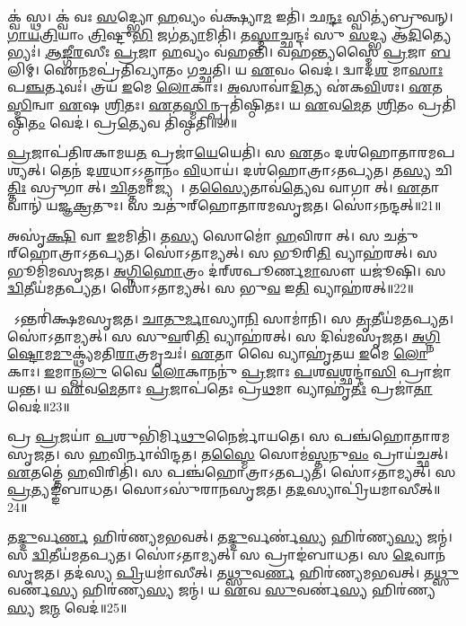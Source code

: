 𑌕𑍍𑌵॑ 𑌸𑍍𑌥।
𑌕𑍍𑌵॑ 𑌵𑌃 \ul{𑌸}𑌦𑍍𑌭𑍍𑌯𑍋 \ul{𑌹}𑌵𑍍𑌯𑌂 𑌵॑𑌕𑍍𑌷𑍍𑌯𑌾\ul{𑌮} 𑌇𑌤𑌿॑।
𑌛\ul{𑌨𑍍𑌦𑌃} 𑌸𑍍𑌵𑌿𑌤𑍍𑌯॑𑌬𑍍𑌰𑍁𑌵𑌨𑍍।
\ul{𑌗𑌾}\ul{𑌯}\ul{𑌤𑍍𑌰𑌿}𑌯𑌾𑌂 \ul{𑌤𑍍𑌰𑌿}𑌷𑍍𑌟𑍁\ul{𑌭𑌿} 𑌜𑌗॑\ul{𑌤𑍍𑌯𑌾}𑌮𑌿𑌤𑌿॑।
𑌤\ul{𑌸𑍍𑌮𑌾}𑌚𑍍𑌛𑌨𑍍𑌦𑌃॑ 𑌸𑍁 \ul{𑌸}𑌦𑍍𑌭𑍍𑌯 𑌆॑\ul{𑌦𑌿}𑌤𑍍𑌯𑍇𑌭𑍍𑌯𑌃॑।
\ul{𑌆}\ul{𑌙𑍍𑌗𑍀}\ul{𑌰}𑌸𑍀𑌃 \ul{𑌪𑍍𑌰}𑌜𑌾 \ul{𑌹}𑌵𑍍𑌯𑌂 𑌵॑𑌹𑌨𑍍𑌤𑌿।
𑌵𑌹॑𑌨𑍍𑌤𑍍𑌯𑌸𑍍𑌮𑍈 \ul{𑌪𑍍𑌰}𑌜𑌾 \ul{𑌬}𑌲𑌿𑌮𑍍।
𑌐\ul{𑌨}𑌮𑌪𑍍𑌰॑𑌤𑌿𑌖𑍍𑌯𑌾𑌤𑌂 𑌗𑌚𑍍𑌛𑌤𑌿।
𑌯 \ul{𑌏}𑌵𑌂 𑌵𑍇𑌦॑।
𑌦𑍍𑌵𑌾𑌦॑\ul{𑌶} 𑌮𑌾\ul{𑌸𑌾𑌃} 𑌪\ul{𑌞𑍍𑌚}𑌰𑍍𑌤𑌵𑌃॑।
𑌤𑍍𑌰𑌯॑ \ul{𑌇}𑌮𑍇 \ul{𑌲𑍋}𑌕𑌾𑌃।
\ul{𑌅}𑌸𑌾𑌵𑌾॑\ul{𑌦𑌿}𑌤𑍍𑌯 𑌏॑𑌕\ul{𑌵𑌿}\ul{}𑌶𑌃।
\ul{𑌏}𑌤\ul{𑌸𑍍𑌮𑌿}𑌨𑍍𑌵𑌾 \ul{𑌏}𑌷 \ul{𑌶𑍍𑌰𑌿}𑌤𑌃।
\ul{𑌏}𑌤\ul{𑌸𑍍𑌮𑌿}𑌨𑍍𑌪𑍍𑌰𑌤𑌿॑\-𑌷𑍍𑌠𑌿𑌤𑌃।
𑌯 \ul{𑌏}𑌵\ul{𑌮𑍇}𑌤 \ul{𑌶𑍍𑌰𑌿}𑌤𑌂 𑌪𑍍𑌰𑌤𑌿॑\-𑌷𑍍𑌠𑌿\ul{𑌤𑌂} 𑌵𑍇𑌦॑।
𑌪𑍍𑌰\ul{𑌤𑍍𑌯𑍇}𑌵 𑌤𑌿॑𑌷𑍍𑌠𑌤𑌿॥20॥\anuvakamend[\ul{𑌸𑍍𑌯𑌾}𑌦𑌿𑌤𑌿॑ 𑌸𑌂𑌵\ul{𑌥𑍍𑌸}𑌰𑍋 𑌜॑𑌨𑌯\ul{𑌧𑍍𑌵}𑌮𑌿𑌤𑍀𑌤𑍍𑌯॑𑌬𑍍𑌰\ul{𑌵𑍀}𑌤𑍍𑌪𑍂\ul{𑌰𑍍𑌵} 𑌇𑌤𑍍𑌯𑌾॑\ul{𑌦𑌿}𑌤𑍍𑌯𑌾\ul{𑌨𑍃}𑌤\ul{𑌵𑌃} 𑌷𑌟𑍍𑌚॑]

\ul{𑌪𑍍𑌰}𑌜𑌾𑌪॑𑌤𑌿𑌰𑌕𑌾𑌮𑌯\ul{𑌤} 𑌪𑍍𑌰𑌜𑌾॑\ul{𑌯𑍇}𑌯𑍇𑌤𑌿॑।
𑌸 \ul{𑌏}𑌤𑌂 𑌦𑌶॑𑌹𑍋𑌤𑌾𑌰𑌮𑌪𑌶𑍍𑌯𑌤𑍍।
𑌤𑍇𑌨॑ 𑌦\ul{𑌶}𑌧𑌾\-𑌽𑌽𑌤𑍍𑌮𑌾𑌨𑌂॑ \ul{𑌵𑌿}𑌧𑌾𑌯॑।
𑌦𑌶॑𑌹𑍋𑌤𑍍𑌰𑌾\-𑌽𑌤𑌪𑍍𑌯𑌤।
𑌤\ul{𑌸𑍍𑌯} 𑌚𑌿\ul{𑌤𑍍𑌤𑌿𑌃} 𑌸𑍍𑌰𑍁𑌗𑌾𑌸𑍀᳚𑌤𑍍।
\ul{𑌚𑌿}𑌤𑍍𑌤𑌮𑌾𑌜𑍍𑌯𑌮𑍍᳚।
𑌤\ul{𑌸𑍍𑌯𑍈}𑌤𑌾𑌵॑\ul{𑌤𑍍𑌯𑍇}𑌵 𑌵𑌾𑌗𑌾𑌸𑍀᳚𑌤𑍍।
\ul{𑌏}𑌤𑌾𑌵𑌾𑌨𑍍॑ 𑌯𑌜𑍍𑌞\ul{𑌕𑍍𑌰}𑌤𑍁𑌃।
𑌸 𑌚𑌤𑍁॑𑌰𑍍‌\mbox{}𑌹𑍋𑌤𑌾𑌰𑌮𑌸𑍃𑌜𑌤।
𑌸𑍋॑𑌽𑌨𑌨𑍍𑌦𑌤𑍍॥21॥

𑌅𑌸𑍃॑\ul{𑌕𑍍𑌷𑌿} 𑌵𑌾 \ul{𑌇}𑌮𑌮𑌿𑌤𑌿॑।
𑌤\ul{𑌸𑍍𑌯} 𑌸𑍋𑌮𑍋॑ \ul{𑌹}𑌵𑌿𑌰𑌾𑌸𑍀᳚𑌤𑍍।
𑌸 𑌚𑌤𑍁॑𑌰𑍍‌\mbox{}𑌹𑍋𑌤𑍍𑌰𑌾\-𑌽𑌤𑌪𑍍𑌯𑌤।
𑌸𑍋॑𑌽𑌤𑌾𑌮𑍍𑌯𑌤𑍍।
𑌸 𑌭𑍂𑌰𑌿\ul{𑌤𑌿} 𑌵𑍍𑌯𑌾𑌹॑𑌰𑌤𑍍।
𑌸 𑌭𑍂𑌮𑌿॑𑌮𑌸𑍃𑌜𑌤।
\ul{𑌅}\ul{𑌗𑍍𑌨𑌿}\ul{𑌹𑍋}𑌤𑍍𑌰𑌂 𑌦॑𑌰𑍍‌\mbox{}𑌶𑌪𑍂𑌰𑍍𑌣\ul{𑌮𑌾}𑌸𑍗 𑌯𑌜𑍂॑𑌷𑌿।
𑌸 \ul{𑌦𑍍𑌵𑌿}𑌤𑍀𑌯॑𑌮𑌤𑌪𑍍𑌯𑌤।
𑌸𑍋॑𑌽𑌤𑌾𑌮𑍍𑌯𑌤𑍍।
𑌸 𑌭𑍁\ul{𑌵} 𑌇\ul{𑌤𑌿} 𑌵𑍍𑌯𑌾𑌹॑𑌰𑌤𑍍॥22॥

𑌸𑍋᳚𑌽𑌨𑍍𑌤𑌰𑌿॑𑌕𑍍𑌷𑌮𑌸𑍃𑌜𑌤।
\ul{𑌚𑌾}\ul{𑌤𑍁}\ul{𑌰𑍍𑌮𑌾}𑌸𑍍𑌯𑌾\ul{𑌨𑌿} 𑌸𑌾𑌮𑌾॑𑌨𑌿।
𑌸 \ul{𑌤𑍃}𑌤𑍀𑌯॑𑌮𑌤𑌪𑍍𑌯𑌤।
𑌸𑍋॑𑌽𑌤𑌾𑌮𑍍𑌯𑌤𑍍।
𑌸 𑌸𑍁\ul{𑌵}𑌰𑌿\ul{𑌤𑌿} 𑌵𑍍𑌯𑌾𑌹॑𑌰𑌤𑍍।
𑌸 𑌦𑌿𑌵॑𑌮𑌸𑍃𑌜𑌤।
\ul{𑌅}\ul{𑌗𑍍𑌨𑌿}\ul{𑌷𑍍𑌟𑍋}𑌮\ul{𑌮𑍁}𑌕𑍍𑌥𑍍𑌯॑𑌮𑌤𑌿\ul{𑌰𑌾}𑌤𑍍𑌰𑌮𑍃𑌚𑌃॑।
\ul{𑌏}𑌤𑌾 𑌵𑍈 𑌵𑍍𑌯𑌾𑌹𑍃॑𑌤𑌯 \ul{𑌇}𑌮𑍇 \ul{𑌲𑍋}𑌕𑌾𑌃।
\ul{𑌇}𑌮𑌾𑌨𑍍𑌖\ul{𑌲𑍁} 𑌵𑍈 \ul{𑌲𑍋}𑌕𑌾𑌨𑌨𑍁॑ \ul{𑌪𑍍𑌰}𑌜𑌾𑌃 \ul{𑌪}𑌶\ul{𑌵}𑌶𑍍𑌛𑌨𑍍𑌦𑌾॑\ul{𑌸𑌿} 𑌪𑍍𑌰𑌾𑌜𑌾॑𑌯𑌨𑍍𑌤।
𑌯 \ul{𑌏}𑌵\ul{𑌮𑍇}𑌤𑌾𑌃 \ul{𑌪𑍍𑌰}𑌜𑌾𑌪॑𑌤𑍇𑌃 𑌪𑍍𑌰\ul{𑌥}𑌮𑌾 𑌵𑍍𑌯𑌾𑌹𑍃॑\ul{𑌤𑍀𑌃} 𑌪𑍍𑌰𑌜𑌾॑\ul{𑌤𑌾} 𑌵𑍇𑌦॑॥23॥

𑌪𑍍𑌰 \ul{𑌪𑍍𑌰}𑌜𑌯𑌾॑ \ul{𑌪}𑌶𑍁𑌭𑌿॑𑌰𑍍𑌮𑌿\ul{𑌥𑍁}𑌨𑍈𑌰𑍍𑌜𑌾॑𑌯𑌤𑍇।
𑌸 𑌪𑌞𑍍𑌚॑𑌹𑍋𑌤𑌾𑌰𑌮𑌸𑍃𑌜𑌤।
𑌸 \ul{𑌹}𑌵𑌿𑌰𑍍𑌨𑌾𑌵𑌿॑𑌨𑍍𑌦𑌤।
𑌤\ul{𑌸𑍍𑌮𑍈} 𑌸𑍋𑌮॑\ul{𑌸𑍍𑌤}𑌨𑍁\ul{𑌵𑌂} 𑌪𑍍𑌰𑌾𑌯॑𑌚𑍍𑌛𑌤𑍍।
\ul{𑌏}𑌤𑌤𑍍𑌤𑍇॑ \ul{𑌹}𑌵𑌿𑌰𑌿𑌤𑌿॑।
𑌸 𑌪𑌞𑍍𑌚॑𑌹𑍋𑌤𑍍𑌰𑌾\-𑌽𑌤𑌪𑍍𑌯𑌤।
𑌸𑍋॑𑌽𑌤𑌾𑌮𑍍𑌯𑌤𑍍।
𑌸 \ul{𑌪𑍍𑌰}𑌤𑍍𑌯𑌙𑍍𑌙॑𑌬𑌾𑌧𑌤।
𑌸𑍋𑌽𑌸𑍁॑𑌰𑌾𑌨𑌸𑍃𑌜𑌤।
𑌤\ul{𑌦}𑌸𑍍𑌯𑌾𑌪𑍍𑌰𑌿॑𑌯𑌮𑌾𑌸𑍀𑌤𑍍॥24॥

𑌤\ul{𑌦𑍍𑌦𑍁}𑌰𑍍𑌵\ul{𑌰𑍍𑌣}\ul{} 𑌹𑌿𑌰॑𑌣𑍍𑌯𑌮𑌭𑌵𑌤𑍍।
𑌤\ul{𑌦𑍍𑌦𑍁}𑌰𑍍𑌵𑌰𑍍𑌣॑\ul{𑌸𑍍𑌯} 𑌹𑌿𑌰॑𑌣𑍍𑌯\ul{𑌸𑍍𑌯} 𑌜𑌨𑍍𑌮॑।
𑌸 \ul{𑌦𑍍𑌵𑌿}𑌤𑍀𑌯॑𑌮𑌤𑌪𑍍𑌯𑌤।
𑌸𑍋॑𑌽𑌤𑌾𑌮𑍍𑌯𑌤𑍍।
𑌸 𑌪𑍍𑌰𑌾𑌙॑𑌬𑌾𑌧𑌤।
𑌸 \ul{𑌦𑍇}𑌵𑌾𑌨॑𑌸𑍃𑌜𑌤।
𑌤𑌦॑𑌸𑍍𑌯 \ul{𑌪𑍍𑌰𑌿}𑌯𑌮𑌾॑𑌸𑍀𑌤𑍍।
𑌤\ul{𑌥𑍍𑌸𑍁}𑌵\ul{𑌰𑍍𑌣}\ul{} 𑌹𑌿𑌰॑𑌣𑍍𑌯𑌮𑌭𑌵𑌤𑍍।
𑌤\ul{𑌥𑍍𑌸𑍁}𑌵𑌰𑍍𑌣॑\ul{𑌸𑍍𑌯} 𑌹𑌿𑌰॑𑌣𑍍𑌯\ul{𑌸𑍍𑌯} 𑌜𑌨𑍍𑌮॑।
𑌯 \ul{𑌏}𑌵 \ul{𑌸𑍁}𑌵𑌰𑍍𑌣॑\ul{𑌸𑍍𑌯} 𑌹𑌿𑌰॑𑌣𑍍𑌯\ul{𑌸𑍍𑌯} 𑌜\ul{𑌨𑍍𑌮} 𑌵𑍇𑌦॑॥25॥

